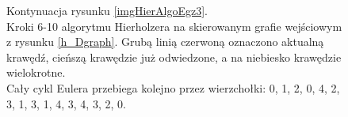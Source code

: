 \documentclass[a4paper, 12pt, twoside, openright]{article}
\begin{document}
\begin{figure}[p]
   	\quad
   	
   	\caption[]{Kontynuacja rysunku \ref{imgHierAlgoEgz3}.\\Kroki 6-10 algorytmu Hierholzera na skierowanym grafie wejściowym z rysunku \ref{h_Dgraph}. Grubą linią czerwoną oznaczono aktualną krawędź, cieńszą krawędzie już odwiedzone, a na niebiesko krawędzie wielokrotne. \\Cały cykl Eulera przebiega kolejno przez wierzchołki: 0, 1, 2, 0, 4, 2, 3, 1, 3, 1, 4, 3, 4, 3, 2, 0.}
   	\label{imgHierAlgoEgz4}
   \end{figure}	
\end{document}
